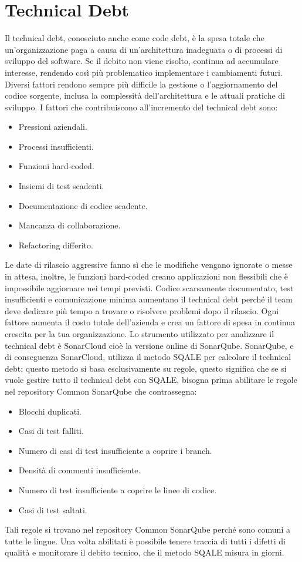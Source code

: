 \section{Technical Debt}
Il technical debt, conosciuto anche come code debt, è la spesa totale che un'organizzazione paga a causa di un'architettura inadeguata o di processi di sviluppo del software. Se il debito non viene risolto, continua ad accumulare interesse, rendendo così più problematico implementare i cambiamenti futuri. Diversi fattori rendono sempre più difficile la gestione o l'aggiornamento del codice sorgente, inclusa la complessità dell'architettura e le attuali pratiche di sviluppo. I fattori che contribuiscono all'incremento del technical debt sono:
\begin{itemize}
\item Pressioni aziendali.
\item Processi insufficienti.
\item Funzioni hard-coded.
\item Insiemi di test scadenti.
\item Documentazione di codice scadente.
\item Mancanza di collaborazione.
\item Refactoring differito.
\end{itemize}
Le date di rilascio aggressive fanno sì che le modifiche vengano ignorate o messe in attesa, inoltre, le funzioni hard-coded creano applicazioni non flessibili che è impossibile aggiornare nei tempi previsti. Codice scarsamente documentato, test insufficienti e comunicazione minima aumentano il technical debt perché il team deve dedicare più tempo a trovare o risolvere problemi dopo il rilascio. Ogni fattore aumenta il costo totale dell'azienda e crea un fattore di spesa in continua crescita per la tua organizzazione. Lo strumento utilizzato per analizzare il technical debt è SonarCloud cioè la versione online di SonarQube. SonarQube, e di conseguenza SonarCloud, utilizza il metodo SQALE per calcolare il technical debt; questo metodo si basa esclusivamente su regole, questo significa che se si vuole gestire tutto il technical debt con SQALE, bisogna prima abilitare le regole nel repository Common SonarQube che contrassegna:
\begin{itemize}
\item Blocchi duplicati.
\item Casi di test falliti.
\item Numero di casi di test insufficiente a coprire i branch.
\item Densità di commenti insufficiente.
\item Numero di test insufficiente a coprire le linee di codice.
\item Casi di test saltati.
\end{itemize}
Tali regole si trovano nel repository Common SonarQube perché sono comuni a tutte le lingue. Una volta abilitati è possibile tenere traccia di tutti i difetti di qualità e monitorare il debito tecnico, che il metodo SQALE misura in giorni.
